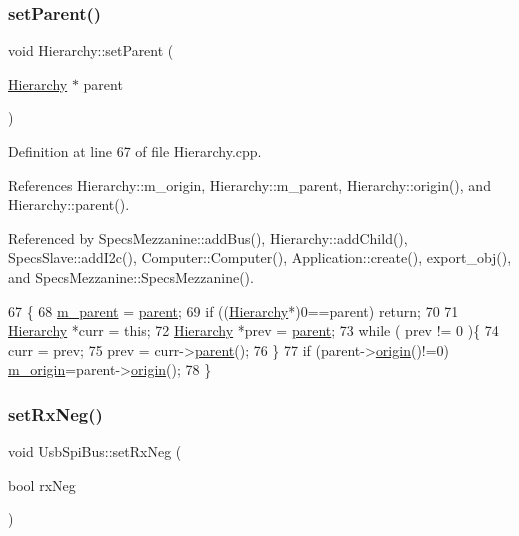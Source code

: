 \subsubsection{\texorpdfstring{set\+Parent()}{setParent()}}
{\footnotesize\ttfamily void Hierarchy\+::set\+Parent (\begin{DoxyParamCaption}\item[{\hyperlink{classHierarchy}{Hierarchy} $\ast$}]{parent }\end{DoxyParamCaption})\hspace{0.3cm}{\ttfamily [inherited]}}



Definition at line 67 of file Hierarchy.\+cpp.



References Hierarchy\+::m\+\_\+origin, Hierarchy\+::m\+\_\+parent, Hierarchy\+::origin(), and Hierarchy\+::parent().



Referenced by Specs\+Mezzanine\+::add\+Bus(), Hierarchy\+::add\+Child(), Specs\+Slave\+::add\+I2c(), Computer\+::\+Computer(), Application\+::create(), export\+\_\+obj(), and Specs\+Mezzanine\+::\+Specs\+Mezzanine().


\begin{DoxyCode}
67                                               \{
68   \hyperlink{classHierarchy_a5814bb280d4e8539ab25ab6cbfb9cc4f}{m\_parent} = \hyperlink{classHierarchy_a1c7bec8257e717f9c1465e06ebf845fc}{parent};
69   \textcolor{keywordflow}{if} ((\hyperlink{classHierarchy}{Hierarchy}*)0==parent) \textcolor{keywordflow}{return};
70 
71   \hyperlink{classHierarchy}{Hierarchy} *curr = \textcolor{keyword}{this};
72   \hyperlink{classHierarchy}{Hierarchy} *prev = \hyperlink{classHierarchy_a1c7bec8257e717f9c1465e06ebf845fc}{parent};
73   \textcolor{keywordflow}{while} ( prev != 0 )\{
74     curr = prev;
75     prev = curr->\hyperlink{classHierarchy_a1c7bec8257e717f9c1465e06ebf845fc}{parent}();
76   \}
77   \textcolor{keywordflow}{if} (parent->\hyperlink{classHierarchy_aee461dc930ce3871636ff87f075b1b83}{origin}()!=0) \hyperlink{classHierarchy_a16c73e557d3a7c156ffb5dc4102d148e}{m\_origin}=parent->\hyperlink{classHierarchy_aee461dc930ce3871636ff87f075b1b83}{origin}();
78 \}
\end{DoxyCode}
\mbox{\label{classUsbSpiBus_aa6c039bb03737e9fd943cbdd2b23388c}} 
\subsubsection{\texorpdfstring{set\+Rx\+Neg()}{setRxNeg()}}
{\footnotesize\ttfamily void Usb\+Spi\+Bus\+::set\+Rx\+Neg (\begin{DoxyParamCaption}\item[{bool}]{rx\+Neg }\end{DoxyParamCaption})\hspace{0.3cm}{\ttfamily [inline]}}




